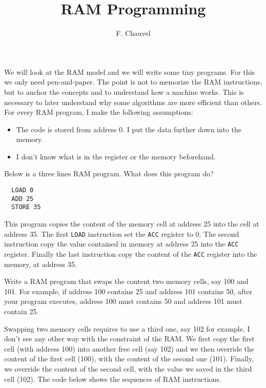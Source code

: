 \documentclass{aldast}
\title{RAM Programming}
\author{F. Chauvel}
\begin{document}
\maketitle

We will look at the RAM model and we will write some tiny
programs. For this we only need pen-and-paper. The point is not to
memorize the RAM instructions, but to anchor the concepts and to
understand how a machine works. This is necessary to later understand
why some algorithms are more efficient than others. For every RAM
program, I make the following assumptions:
\begin{itemize}
\item The code is stored from address 0. I put the data further down
  into the memory.
\item I don't know what is in the register or the memory beforehand.
\end{itemize}

\begin{exercise}
Below is a three lines RAM program. What does this program do?
\begin{verbatim}
  LOAD 0
  ADD 25
  STORE 35
\end{verbatim}
\end{exercise}

This program copies the content of the memory cell at address 25 into
the cell at address 35. The first \texttt{LOAD} instruction set the
\texttt{ACC} register to 0. The second instruction copy the value
contained in memory at address 25 into the \texttt{ACC}
register. Finally the last instruction copy the content of the
\texttt{ACC} register into the memory, at address 35.

\begin{exercise}
  Write a RAM program that swaps the content two memory cells, say 100
  and 101. For example, if address 100 contains 25 and address 101
  contains 50, after your program executes, address 100 must contains
  50 and address 101 must contain 25.
\end{exercise}

Swapping two memory cells requires to use a third one, say 102 for
example. I don't see any other way with the constraint of the RAM. We
first copy the first cell (with address 100) into another free cell
(say 102) and we then override the content of the first cell (100),
with the content of the second one (101). Finally, we override the
content of the second cell, with the value we saved in the third cell
(102). The code below shows the sequences of RAM instructions.
\end{document}
